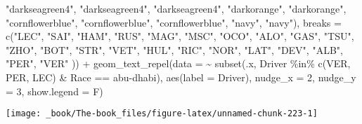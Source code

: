 \documentclass[
]{book}
\newenvironment{Shaded}{\begin{snugshade}}{\end{snugshade}}
\newcommand{\AttributeTok}[1]{\textcolor[rgb]{0.77,0.63,0.00}{#1}}
\newcommand{\DecValTok}[1]{\textcolor[rgb]{0.00,0.00,0.81}{#1}}
\newcommand{\FunctionTok}[1]{\textcolor[rgb]{0.00,0.00,0.00}{#1}}
\newcommand{\NormalTok}[1]{#1}
\newcommand{\SpecialCharTok}[1]{\textcolor[rgb]{0.00,0.00,0.00}{#1}}
\newcommand{\StringTok}[1]{\textcolor[rgb]{0.31,0.60,0.02}{#1}}
\begin{document}
\begin{Shaded}
\begin{Highlighting}[]
                                \StringTok{"darkseagreen4"}\NormalTok{, }\StringTok{"darkseagreen4"}\NormalTok{, }\StringTok{"darkseagreen4"}\NormalTok{,}
                                \StringTok{"darkorange"}\NormalTok{, }\StringTok{"darkorange"}\NormalTok{,}
                                \StringTok{"cornflowerblue"}\NormalTok{, }\StringTok{"cornflowerblue"}\NormalTok{, }\StringTok{"cornflowerblue"}\NormalTok{,}
                                \StringTok{"navy"}\NormalTok{, }\StringTok{"navy"}\NormalTok{),}
                     \AttributeTok{breaks =} \FunctionTok{c}\NormalTok{(}\StringTok{"LEC"}\NormalTok{, }\StringTok{"SAI"}\NormalTok{,}
                                \StringTok{"HAM"}\NormalTok{, }\StringTok{"RUS"}\NormalTok{, }
                                \StringTok{"MAG"}\NormalTok{, }\StringTok{"MSC"}\NormalTok{, }
                                \StringTok{"OCO"}\NormalTok{, }\StringTok{"ALO"}\NormalTok{,}
                                \StringTok{"GAS"}\NormalTok{, }\StringTok{"TSU"}\NormalTok{,  }
                                \StringTok{"ZHO"}\NormalTok{, }\StringTok{"BOT"}\NormalTok{,}
                                \StringTok{"STR"}\NormalTok{, }\StringTok{"VET"}\NormalTok{, }\StringTok{"HUL"}\NormalTok{, }
                                \StringTok{"RIC"}\NormalTok{, }\StringTok{"NOR"}\NormalTok{,}
                                \StringTok{"LAT"}\NormalTok{, }\StringTok{"DEV"}\NormalTok{, }\StringTok{"ALB"}\NormalTok{,}
                                \StringTok{"PER"}\NormalTok{, }\StringTok{"VER"}
\NormalTok{                                )) }\SpecialCharTok{+}
  \FunctionTok{geom\_text\_repel}\NormalTok{(}\AttributeTok{data =} \SpecialCharTok{\textasciitilde{}} \FunctionTok{subset}\NormalTok{(.x, Driver }\SpecialCharTok{\%in\%} \FunctionTok{c}\NormalTok{(}\StringTok{\textquotesingle{}VER\textquotesingle{}}\NormalTok{, }\StringTok{\textquotesingle{}PER\textquotesingle{}}\NormalTok{, }\StringTok{\textquotesingle{}LEC\textquotesingle{}}\NormalTok{) }\SpecialCharTok{\&}\NormalTok{ Race }\SpecialCharTok{==} \StringTok{\textquotesingle{}abu{-}dhabi\textquotesingle{}}\NormalTok{),}
            \FunctionTok{aes}\NormalTok{(}\AttributeTok{label =}\NormalTok{ Driver),}
            \AttributeTok{nudge\_x =} \DecValTok{2}\NormalTok{, }\AttributeTok{nudge\_y =} \DecValTok{3}\NormalTok{, }\AttributeTok{show.legend =}\NormalTok{ F)}
\end{Highlighting}
\end{Shaded}

\begin{center}\texttt{[image: \_book/The-book\_files/figure-latex/unnamed-chunk-223-1]} \end{center}
\end{document}
